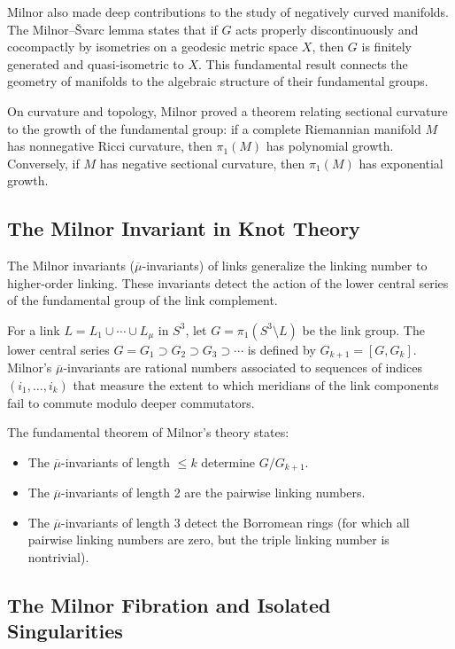 Milnor also made deep contributions to the study of negatively curved manifolds. The Milnor--Švarc lemma states that if $G$ acts properly discontinuously and cocompactly by isometries on a geodesic metric space $X$, then $G$ is finitely generated and quasi-isometric to $X$. This fundamental result connects the geometry of manifolds to the algebraic structure of their fundamental groups.

On curvature and topology, Milnor proved a theorem relating sectional curvature to the growth of the fundamental group: if a complete Riemannian manifold $M$ has nonnegative Ricci curvature, then $\pi_1(M)$ has polynomial growth. Conversely, if $M$ has negative sectional curvature, then $\pi_1(M)$ has exponential growth.

\subsection{The Milnor Invariant in Knot Theory}

The Milnor invariants ($\overline{\mu}$-invariants) of links generalize the linking number to higher-order linking. These invariants detect the action of the lower central series of the fundamental group of the link complement.

For a link $L = L_1 \cup \cdots \cup L_\mu$ in $S^3$, let $G = \pi_1(S^3 \setminus L)$ be the link group. The lower central series $G = G_1 \supset G_2 \supset G_3 \supset \cdots$ is defined by $G_{k+1} = [G, G_k]$. Milnor's $\overline{\mu}$-invariants are rational numbers associated to sequences of indices $(i_1, \ldots, i_k)$ that measure the extent to which meridians of the link components fail to commute modulo deeper commutators.

The fundamental theorem of Milnor's theory states:
\begin{itemize}
\item The $\overline{\mu}$-invariants of length $\leq k$ determine $G/G_{k+1}$.
\item The $\overline{\mu}$-invariants of length 2 are the pairwise linking numbers.
\item The $\overline{\mu}$-invariants of length 3 detect the Borromean rings (for which all pairwise linking numbers are zero, but the triple linking number is nontrivial).
\end{itemize}

\subsection{The Milnor Fibration and Isolated Singularities}

